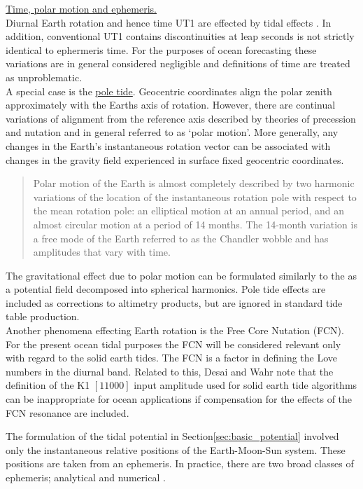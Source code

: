 \underline{Time, polar motion and ephemeris.}\\ 
Diurnal Earth rotation and hence time UT1 are effected by tidal effects \citep[sec 8]{Anonymous:2004tm}.  In addition, conventional UT1 contains discontinuities at leap seconds is not strictly identical to ephermeris time.  For the purposes of ocean forecasting these variations are in general considered negligible and definitions of time are treated as unproblematic.\\




A special case is the \underline{pole tide}. Geocentric coordinates align the polar zenith approximately with the Earths axis of rotation. However, there are continual variations of alignment from the reference axis described by theories of precession and nutation and in general referred to as `polar motion'.   More generally, any changes in the Earth's instantaneous rotation vector can be associated with changes in the gravity field  experienced in surface fixed geocentric coordinates.\\
\begin{quotation}
Polar motion of the Earth is almost completely described by two harmonic variations of the location of the instantaneous rotation pole with respect to the mean rotation pole: an elliptical motion at an annual period, and an almost circular motion at a period of 14 months. The 14-month variation is a free mode of the Earth referred to as the Chandler wobble and has amplitudes that vary with time. \citep{Desai:2002ev}
\end{quotation}
The gravitational effect due to polar motion can be formulated similarly to the \ATGF{} as a potential field decomposed into spherical harmonics.
Pole tide effects are included as corrections to altimetry products, but are ignored in standard tide table production.\\
Another phenomena effecting Earth rotation is the Free Core Nutation (FCN).  For the present ocean tidal purposes the FCN will be considered relevant only with regard to the solid earth tides.  The FCN is a factor in defining the  Love numbers in the diurnal band.   Related to this, Desai and Wahr note that the definition of the K1 $[1 1 0 0 0]$ input amplitude used for solid earth tide algorithms can be inappropriate for ocean applications if compensation for the effects of the FCN resonance are included\cite{Desai:1995je}.



The formulation of the tidal potential in Section\ref{sec:basic_potential} involved only the instantaneous relative positions of the Earth-Moon-Sun system.   These positions are taken from an ephemeris.  In practice, there are two broad classes of ephemeris; analytical and numerical \citep{Wenzel:1997kn}.


